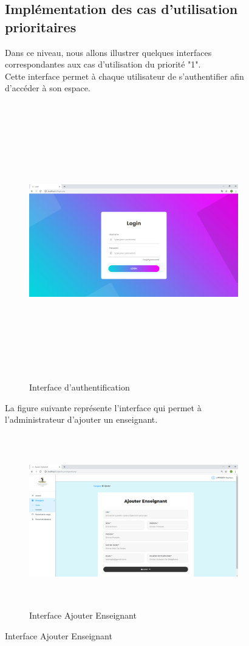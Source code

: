 \documentclass[12 pt]{report}
\begin{document}
\begin{figure}[h]
\begin{center}
\subsection{Implémentation des cas d'utilisation prioritaires }
Dans ce niveau, nous allons illustrer quelques interfaces correspondantes aux cas d'utilisation du priorité "1".\\

Cette interface permet à chaque utilisateur de s’authentifier afin d’accéder à son espace.


\begin{figure}[h]
 \begin{center}
\includegraphics[width= 18 cm ,height=  12cm]{login.PNG}
\caption{Interface d'authentification}

\end{center}
\end{figure}
\newpage
La figure suivante représente l'interface qui permet à l'administrateur d'ajouter un enseignant.
\begin{figure}[h]
 \begin{center}
\includegraphics[width= 18 cm ,height=7.5cm]{ajouter_enseignant.PNG}
\caption{Interface Ajouter Enseignant}


\end{center}
\end{figure}
\end{center}
\end{figure}
\end{document}
